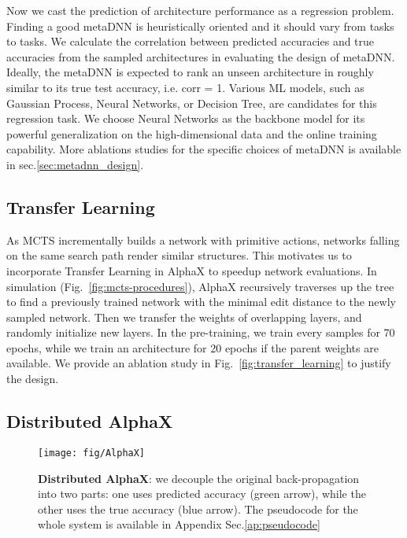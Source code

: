 \documentclass[10pt,twocolumn,letterpaper]{article}
\begin{document}
Now we cast the prediction of architecture performance as a regression problem. Finding a good metaDNN is heuristically oriented and it should vary from tasks to tasks. We calculate the correlation between predicted accuracies and true accuracies from the sampled architectures in evaluating the design of metaDNN. Ideally, the metaDNN is expected to rank an unseen architecture in roughly similar to its true test accuracy, i.e. corr = 1. Various ML models, such as Gaussian Process, Neural Networks, or Decision Tree, are candidates for this regression task. We choose Neural Networks as the backbone model for its powerful generalization on the high-dimensional data and the online training capability. More ablations studies for the specific choices of metaDNN is available in sec.\ref{sec:metadnn_design}.

\subsection{ Transfer Learning }
As MCTS incrementally builds a network with primitive actions, networks falling on the same search path render similar structures. This motivates us to incorporate Transfer Learning in AlphaX to speedup network evaluations. In simulation (Fig.~\ref{fig:mcts-procedures}), AlphaX recursively traverses up the tree to find a previously trained network with the minimal edit distance to the newly sampled network. Then we transfer the weights of overlapping layers, and randomly initialize new layers. In the pre-training, we train every samples for 70 epochs, while we train an architecture for 20 epochs if the parent weights are available. We provide an ablation study in Fig.~\ref{fig:transfer_learning} to justify the design.    







\subsection{Distributed AlphaX}
\label{sec:distributed}

\begin{figure}
  \begin{center}
    \texttt{[image: fig/AlphaX]}
  \end{center}
  \caption{\textbf{Distributed AlphaX}: we decouple the original back-propagation into two parts: one uses predicted accuracy (green arrow), while the other uses the true accuracy (blue arrow).  The pseudocode for the whole system is available in Appendix Sec.\ref{ap:pseudocode} }
  \vspace{-0.1in}
  \label{distributed_alphaX}
\end{figure}
\end{document}
